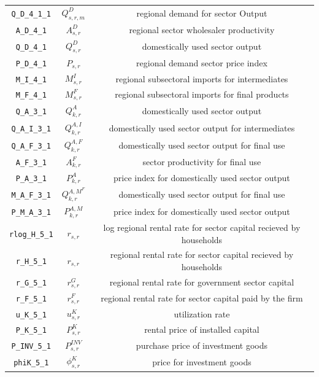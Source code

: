 \begin{center}
\begin{longtable}{ccc}
\texttt{Q\_D\_4\_1\_1} & ${Q^D_{s,r,m}}$ & regional demand for sector Output\\
\texttt{A\_D\_4\_1} & ${A^{D}_{s,r}}$ & regional sector wholesaler productivity\\
\texttt{Q\_D\_4\_1} & ${Q^{D}_{s,r}}$ & domestically used sector output\\
\texttt{P\_D\_4\_1} & ${P_{s,r}}$ & regional demand sector price index\\
\texttt{M\_I\_4\_1} & ${M^I_{s,r}}$ & regional subsectoral imports for intermediates\\
\texttt{M\_F\_4\_1} & ${M^F_{s,r}}$ & regional subsectoral imports for final products\\
\texttt{Q\_A\_3\_1} & ${Q^{A}_{k,r}}$ & domestically used sector output\\
\texttt{Q\_A\_I\_3\_1} & ${Q^{A,I}_{k,r}}$ & domestically used sector output for intermediates\\
\texttt{Q\_A\_F\_3\_1} & ${Q^{A,F}_{k,r}}$ & domestically used sector output for final use\\
\texttt{A\_F\_3\_1} & ${A^{F}_{k,r}}$ & sector productivity for final use\\
\texttt{P\_A\_3\_1} & ${P^{A}_{k,r}}$ & price index for domestically used sector output\\
\texttt{M\_A\_F\_3\_1} & ${Q^{A,M^F}_{k,r}}$ & domestically used sector output for final use\\
\texttt{P\_M\_A\_3\_1} & ${P^{A,M}_{k,r}}$ & price index for domestically used sector output\\
\texttt{rlog\_H\_5\_1} & ${r_{s,r}}$ & log regional rental rate for sector capital recieved by households\\
\texttt{r\_H\_5\_1} & ${r_{s,r}}$ & regional rental rate for sector capital recieved by households\\
\texttt{r\_G\_5\_1} & ${r^G_{s,r}}$ & regional rental rate for government sector capital\\
\texttt{r\_F\_5\_1} & ${r^F_{s,r}}$ & regional rental rate for sector capital paid by the firm\\
\texttt{u\_K\_5\_1} & ${u^K_{s,r}}$ & utilization rate\\
\texttt{P\_K\_5\_1} & ${P^K_{s,r}}$ & rental price of installed capital\\
\texttt{P\_INV\_5\_1} & ${P^{INV}_{s,r}}$ & purchase price of investment goods\\
\texttt{phiK\_5\_1} & ${\phi^K_{s,r}}$ & price for investment goods\\

\end{longtable}
\end{center}
